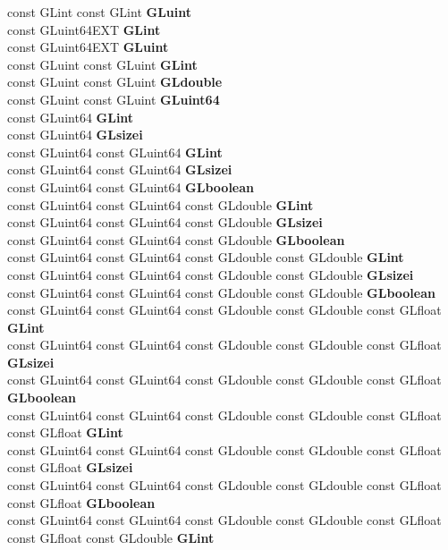 \begin{DoxyCompactItemize}
\begin{tabbing}
\>const GLint const GLint {\bfseries GLuint}\\
\>const GLuint64EXT {\bfseries GLint}\\
\>const GLuint64EXT {\bfseries GLuint}\\
\>const GLuint const GLuint {\bfseries GLint}\\
\>const GLuint const GLuint {\bfseries GLdouble}\\
\>const GLuint const GLuint {\bfseries GLuint64}\\
\>const GLuint64 {\bfseries GLint}\\
\>const GLuint64 {\bfseries GLsizei}\\
\>const GLuint64 const GLuint64 {\bfseries GLint}\\
\>const GLuint64 const GLuint64 {\bfseries GLsizei}\\
\>const GLuint64 const GLuint64 {\bfseries GLboolean}\\
\>const GLuint64 const GLuint64 const GLdouble {\bfseries GLint}\\
\>const GLuint64 const GLuint64 const GLdouble {\bfseries GLsizei}\\
\>const GLuint64 const GLuint64 const GLdouble {\bfseries GLboolean}\\
\>const GLuint64 const GLuint64 const GLdouble const GLdouble {\bfseries GLint}\\
\>const GLuint64 const GLuint64 const GLdouble const GLdouble {\bfseries GLsizei}\\
\>const GLuint64 const GLuint64 const GLdouble const GLdouble {\bfseries GLboolean}\\
\>const GLuint64 const GLuint64 const GLdouble const GLdouble const GLfloat {\bfseries GLint}\\
\>const GLuint64 const GLuint64 const GLdouble const GLdouble const GLfloat {\bfseries GLsizei}\\
\>const GLuint64 const GLuint64 const GLdouble const GLdouble const GLfloat {\bfseries GLboolean}\\
\>const GLuint64 const GLuint64 const GLdouble const GLdouble const GLfloat const GLfloat {\bfseries GLint}\\
\>const GLuint64 const GLuint64 const GLdouble const GLdouble const GLfloat const GLfloat {\bfseries GLsizei}\\
\>const GLuint64 const GLuint64 const GLdouble const GLdouble const GLfloat const GLfloat {\bfseries GLboolean}\\
\>const GLuint64 const GLuint64 const GLdouble const GLdouble const GLfloat const GLfloat const GLdouble {\bfseries GLint}\\

\end{tabbing}
\end{DoxyCompactItemize}
